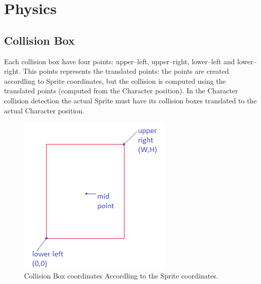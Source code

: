 \chapter{Physics}

	\section{Collision Box}
	Each collision box have four points: upper--left, upper--right, lower--left and lower--right. This points represents the translated points: the points are created accordling to Sprite coordinates, but the collision is computed using the translated points (computed from the Character position). In the Character collision detection the actual Sprite must have its collision boxes translated to the actual Character position.
	\begin{figure}[H]
		\centering
		\includegraphics[]{img/collisionboxcoordinates.png}
		\caption{Collision Box coordinates Accordling to the Sprite coordinates. }
		\label{fig:collisionBox}
		
	\end{figure}